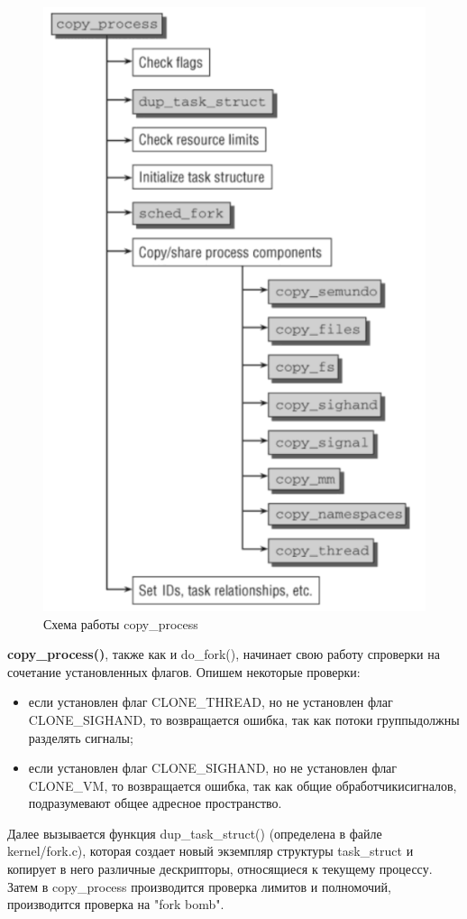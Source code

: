 \begin{figure}[H]
  \centering
  \includegraphics[width=.7\textwidth]{img/copy_process}
  \caption{Схема работы copy\_process}
\end{figure}
\textbf{copy\_process()}, также как и do\_fork(), начинает свою работу спроверки на сочетание установленных флагов. Опишем некоторые проверки:
\begin{itemize}
\item если установлен флаг CLONE\_THREAD, но не установлен флаг CLONE\_SIGHAND, то возвращается ошибка, так как потоки группыдолжны разделять сигналы;
\item если установлен флаг CLONE\_SIGHAND, но не установлен флаг CLONE\_VM, то возвращается ошибка, так как общие обработчикисигналов, подразумевают общее адресное пространство.
\end{itemize}
Далее вызывается функция dup\_task\_struct() (определена в файле kernel/fork.c), которая создает новый экземпляр структуры task\_struct и копирует в него различные дескрипторы, относящиеся к текущему процессу. Затем в copy\_process производится проверка лимитов и полномочий, производится проверка на "fork bomb"\cite{forkBomb}.


